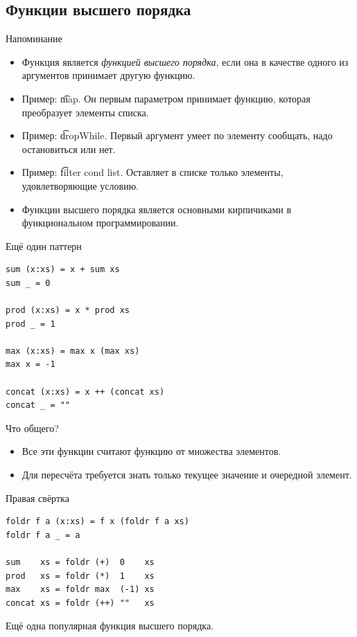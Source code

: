 \subsection{Функции высшего порядка}

\begin{frame}
\end{frame}

\begin{frame}{Напоминание}
	\begin{itemize}
		\item Функция является \textit{функцией высшего порядка}, если она в качестве одного из аргументов принимает другую функцию.
		\item Пример: \t{map}. Он первым параметром принимает функцию, которая преобразует элементы списка.
		\item Пример: \t{dropWhile}. Первый аргумент умеет по элементу сообщать, надо остановиться или нет.
		\item Пример: \t{filter cond list}. Оставляет в списке только элементы, удовлетворяющие условию.
		\item Функции высшего порядка является основными кирпичиками в функциональном программировании.
	\end{itemize}
\end{frame}

\begin{frame}[fragile]{Ещё один паттерн}
\begin{verbatim}
sum (x:xs) = x + sum xs
sum _ = 0

prod (x:xs) = x * prod xs
prod _ = 1

max (x:xs) = max x (max xs)
max x = -1

concat (x:xs) = x ++ (concat xs)
concat _ = ""
\end{verbatim}
	Что общего?
	\pause
	\begin{itemize}
		\item Все эти функции считают функцию от множества элементов.
		\item Для пересчёта требуется знать только текущее значение и очередной элемент.
	\end{itemize}
\end{frame}

\begin{frame}[t,fragile]{Правая свёртка}
\begin{verbatim}
foldr f a (x:xs) = f x (foldr f a xs)
foldr f a _ = a

sum    xs = foldr (+)  0    xs
prod   xs = foldr (*)  1    xs
max    xs = foldr max  (-1) xs
concat xs = foldr (++) ""   xs
\end{verbatim}
	Ещё одна популярная функция высшего порядка.
\end{frame}

